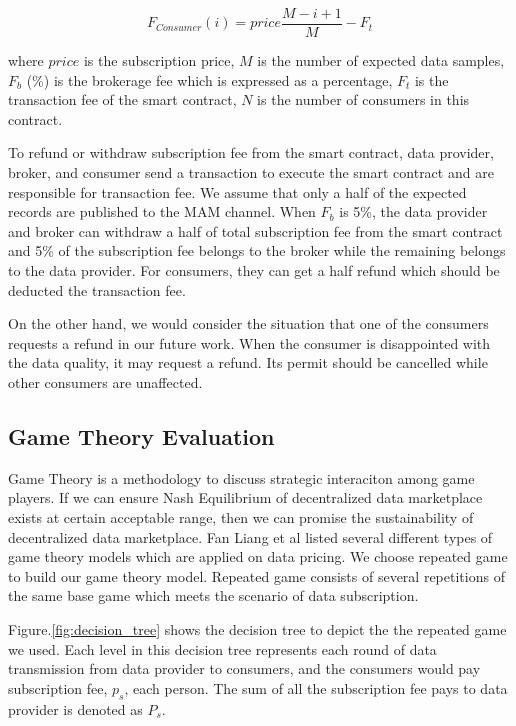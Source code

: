 \documentclass[journal,10pt,a4paper]{IEEEtran}
\begin{document}
\begin{equation}
    F_{Consumer}(i) = price \frac{M-i+1}{M} -F_{t}
\end{equation}

where $price$  is the subscription price, $M$ is the number of expected data samples, $F_{b}$ (\%) is the brokerage fee which is expressed as a percentage, $F_{t}$ is the transaction fee of the smart contract, $N$ is the number of consumers in this contract.

To refund or withdraw subscription fee from the smart contract, data provider, broker, and consumer send a transaction to execute the smart contract and are responsible for transaction fee. We assume that only a half of the expected records are published to the MAM channel. When $F_{b}$ is 5\%, the data provider and broker can withdraw a half of total subscription fee from the smart contract and 5\% of the subscription fee belongs to the broker while the remaining belongs to the data provider. For consumers, they can get a half refund which should be deducted the transaction fee.

On the other hand, we would consider the situation that one of the consumers requests a refund in our future work. When the consumer is disappointed with the data quality, it may request a refund. Its permit should be cancelled while other consumers are unaffected.

\subsection{Game Theory Evaluation}
Game Theory is a methodology to discuss strategic interaciton among game players. If we can ensure Nash Equilibrium of decentralized data marketplace exists at certain acceptable range, then we can promise the sustainability of decentralized data marketplace. Fan Liang et al\cite{SurveyBigDataPricing} listed several different types of game theory models which are applied on data pricing. We choose repeated game to build our game theory model. Repeated game consists of several repetitions of the same base game which meets the scenario of data subscription.

Figure.\ref{fig:decision_tree} shows the decision tree to depict the the repeated game we used. Each level in this decision tree represents each round of data transmission from data provider to consumers, and the consumers would pay subscription fee, $p_s$, each person. The sum of all the subscription fee pays to data provider is denoted as $P_s$.
\end{document}
